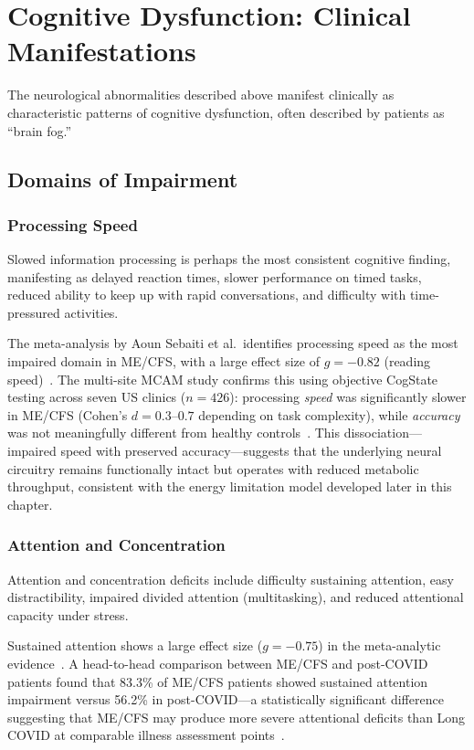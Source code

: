 \section{Cognitive Dysfunction: Clinical Manifestations}
\label{sec:cognitive-clinical}

The neurological abnormalities described above manifest clinically as characteristic patterns of cognitive dysfunction, often described by patients as ``brain fog.''

\subsection{Domains of Impairment}

\subsubsection{Processing Speed}

Slowed information processing is perhaps the most consistent cognitive finding, manifesting as delayed reaction times, slower performance on timed tasks, reduced ability to keep up with rapid conversations, and difficulty with time-pressured activities.

The meta-analysis by Aoun Sebaiti et al.\ identifies processing speed as the most impaired domain in ME/CFS, with a large effect size of $g = -0.82$ (reading speed)~\cite{Sebaiti2022cognitive}. The multi-site MCAM study confirms this using objective CogState testing across seven US clinics ($n = 426$): processing \emph{speed} was significantly slower in ME/CFS (Cohen's $d = 0.3$--$0.7$ depending on task complexity), while \emph{accuracy} was not meaningfully different from healthy controls~\cite{Lange2024cognitive}. This dissociation---impaired speed with preserved accuracy---suggests that the underlying neural circuitry remains functionally intact but operates with reduced metabolic throughput, consistent with the energy limitation model developed later in this chapter.

\subsubsection{Attention and Concentration}

Attention and concentration deficits include difficulty sustaining attention, easy distractibility, impaired divided attention (multitasking), and reduced attentional capacity under stress.

Sustained attention shows a large effect size ($g = -0.75$) in the meta-analytic evidence~\cite{Sebaiti2022cognitive}. A head-to-head comparison between ME/CFS and post-COVID patients found that 83.3\% of ME/CFS patients showed sustained attention impairment versus 56.2\% in post-COVID---a statistically significant difference suggesting that ME/CFS may produce more severe attentional deficits than Long COVID at comparable illness assessment points~\cite{Azcue2022brainfog}.

